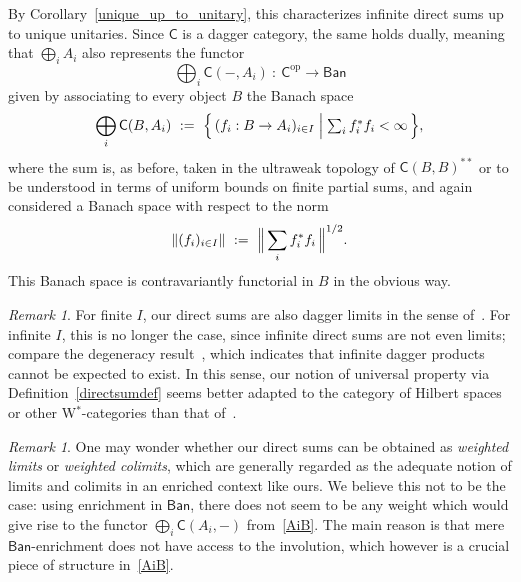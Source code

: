 \documentclass[reqno,T1,11pt]{amsproc}
\newcommand{\op}{\mathrm{op}}
\newcommand{\cat}[1]{\mathsf{#1}}		%
\newcommand{\Ban}{\mathsf{Ban}}			%
\theoremstyle{plain}
\theoremstyle{remark}
\newtheorem{rem}[thm]{Remark}
\numberwithin{equation}{section}
\begin{document}
By Corollary~\ref{unique_up_to_unitary}, this characterizes infinite direct sums up to unique unitaries. Since $\cat{C}$ is a dagger category, the same holds dually, meaning that $\bigoplus_i A_i$ also represents the functor
\[
	\bigoplus_i \cat{C}(-,A_i) \: : \: \cat{C}^\op \to \Ban
\]
given by associating to every object $B$ the Banach space
\[
	\bigoplus_i \cat{C}(B, A_i) \ := \ 
    \Bigl\{\, \textstyle (f_i : B \to A_i)_{i\in I} \Bigm\vert \sum_i f_i^* f_i < \infty \,\Bigr\},
\]
where the sum is, as before, taken in the ultraweak topology of $\cat{C}(B,B)^{**}$ or to be understood in terms of uniform bounds on finite partial sums, and again considered a Banach space with respect to the norm
\[
	\| (f_i)_{i \in I} \|\  := \ \Bigl\| \,\sum_i f_i^* f_i \,\Bigr\|^{1/2}.
\]
This Banach space is contravariantly functorial in $B$ in the obvious way.

\begin{rem}
For finite $I$, our direct sums are also dagger limits in the sense of~\cite{daglims}. For infinite $I$, this is no longer the case, since infinite direct sums are not even limits; compare the degeneracy result~\cite[Theorem~5.2]{daglims}, which indicates that infinite dagger products cannot be expected to exist. In this sense, our notion of universal property via Definition~\ref{directsumdef} seems better adapted to the category of Hilbert spaces or other W$^*$-categories than that of~\cite{daglims}.
\end{rem}

\begin{rem}
	One may wonder whether our direct sums can be obtained as \emph{weighted limits} or \emph{weighted colimits}, which are generally regarded as the adequate notion of limits and colimits in an enriched context like ours. We believe this not to be the case: using enrichment in $\Ban$, there does not seem to be any weight which would give rise to the functor $\bigoplus_i \cat{C}(A_i,-)$ from~\eqref{AiB}. The main reason is that mere $\Ban$-enrichment does not have access to the involution, which however is a crucial piece of structure in~\eqref{AiB}.
\end{rem}
\end{document}
